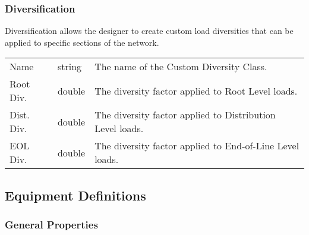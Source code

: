 \documentclass[letterpaper,10pt,english]{sphinxmanual}
\begin{document}
\subsubsection{Diversification}
\label{\detokenize{docs/definitions/index-definitions:diversification}}\label{\detokenize{docs/definitions/index-definitions:diversification-definition}}
Diversification allows the designer to create custom load diversities that can be applied to specific sections of the network.


\begin{savenotes}\sphinxattablestart
\centering
\begin{tabulary}{\linewidth}[t]{|T|T|T|}
\hline
\sphinxstyletheadfamily 
{}
&\sphinxstyletheadfamily 
{}
&\sphinxstyletheadfamily 
{}
\\
\hline
Name
&
string
&
The name of the Custom Diversity Class.
\\
\hline
Root Div.
&
double
&
The diversity factor applied to Root Level loads.
\\
\hline
Dist. Div.
&
double
&
The diversity factor applied to Distribution Level loads.
\\
\hline
EOL Div.
&
double
&
The diversity factor applied to End-of-Line Level loads.
\\
\hline
\end{tabulary}
\par
\sphinxattableend\end{savenotes}


\subsection{Equipment Definitions}
\label{\detokenize{docs/definitions/index-definitions:equipment-definitions}}\label{\detokenize{docs/definitions/index-definitions:id3}}

\subsubsection{General Properties}
\label{\detokenize{docs/definitions/index-definitions:general-properties}}\label{\detokenize{docs/definitions/index-definitions:general-properties-definitions}}
\end{document}
